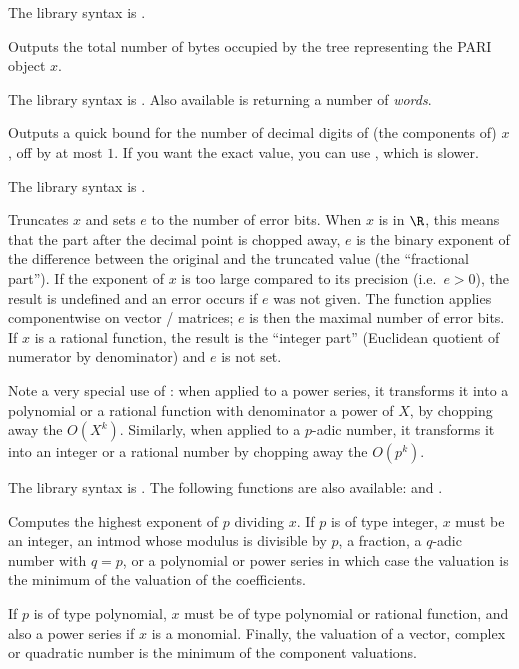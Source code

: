 The library syntax is .

\label{se:sizebyte}
Outputs the total number of bytes occupied by the tree representing the
PARI object $x$.

The library syntax is .
Also available is  returning a
number of \emph{words}.

\label{se:sizedigit}
Outputs a quick bound for the number of decimal
digits of (the components of) $x$, off by at most $1$. If you want the
exact value, you can use , which is slower.

The library syntax is .

\label{se:truncate}
Truncates $x$ and sets $e$ to the number of
error bits. When $x$ is in $\R$, this means that the part after the decimal
point is chopped away, $e$ is the binary exponent of the difference between
the original and the truncated value (the ``fractional part''). If the
exponent of $x$ is too large compared to its precision (i.e.~$e>0$), the
result is undefined and an error occurs if $e$ was not given. The function
applies componentwise on vector / matrices; $e$ is then the maximal number of
error bits. If $x$ is a rational function, the result is the ``integer part''
(Euclidean quotient of numerator by denominator) and $e$ is not set.

Note a very special use of : when applied to a power series, it
transforms it into a polynomial or a rational function with denominator
a power of $X$, by chopping away the $O(X^k)$. Similarly, when applied to
a $p$-adic number, it transforms it into an integer or a rational number
by chopping away the $O(p^k)$.

The library syntax is .
The following functions are also available: 
and .

\label{se:valuation}
Computes the highest
exponent of $p$ dividing $x$. If $p$ is of type integer, $x$ must be an
integer, an intmod whose modulus is divisible by $p$, a fraction, a
$q$-adic number with $q=p$, or a polynomial or power series in which case the
valuation is the minimum of the valuation of the coefficients.

If $p$ is of type polynomial, $x$ must be of type polynomial or rational
function, and also a power series if $x$ is a monomial. Finally, the
valuation of a vector, complex or quadratic number is the minimum of the
component valuations.

